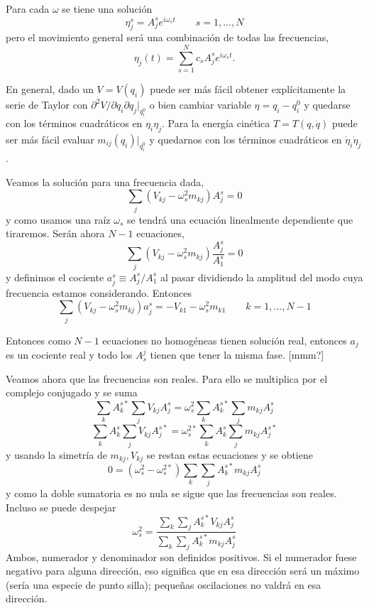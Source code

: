 \documentclass[10pt,oneside]{CBFT_book}
\begin{document}
Para cada $\omega$ se tiene una solución
\[
	\eta_j^s = A_j^s e^{i\omega_s t}	 \qquad s=1,...,N
\]
pero el movimiento general será una combinación de todas las frecuencias,
\[
	\eta_j(t) = \sum_{s=1}^N c_s A_j^s e^{i\omega_s t}.
\]

En general, dado un $V=V(q_i)$ puede ser más fácil obtener explícitamente la serie de Taylor con 
$\partial^2 V/ \partial q_i \partial q_j |_{q_i^0}$ o bien cambiar variable $\eta = q_i - q_i^0$ y quedarse
con los términos cuadráticos en $\eta_i \eta_j$. Para la energía cinética $T=T(q,\dot{q})$ puede ser más
fácil evaluar $m_{ij}(q_i)|_{q_i^0}$ y quedarnos con los términos cuadráticos en $\dot{\eta}_i \dot{\eta}_j$.

Veamos la solución para una frecuencia dada,
\[
	\sum_j ( V_{kj} - \omega_s^2 m_{kj} ) A_j^s = 0
\]
y como usamos una raíz $\omega_s$ se tendrá una ecuación linealmente dependiente que tiraremos. Serán
ahora $N-1$ ecuaciones,
\[
	\sum_j ( V_{kj} - \omega_s^2 m_{kj} ) \frac{A_j^s}{A_1^s} = 0
\]
y definimos el cociente $a_j^s \equiv {A_j^s}/{A_1^s}$ al pasar dividiendo la amplitud del modo cuya frecuencia estamos
considerando. Entonces
\[
	\sum_j ( V_{kj} - \omega_s^2 m_{kj} ) a_j^s = - V_{k1} - \omega_s^2 m_{k1} \qquad k=1,...,N-1
\]

Entonces como $N-1$ ecuaciones no homogéneas tienen solución real, entonces $a_j$ es un cociente real y todo los
$A_s^j$ tienen que tener la misma fase. [mmm?]

Veamos ahora que las frecuencias son reales. Para ello se multiplica por el complejo conjugado y se suma
\[
	\sum_k A_k^{s*} \sum_j V_{kj} A_j^s = \omega_s^2 \sum_k A_k^{s*} \sum_j m_{kj} A_j^s
\]
\[
	\sum_k A_k^{s} \sum_j V_{kj} A_j^{s*} = \omega_s^{2*} \sum_k A_k^{s} \sum_j m_{kj} A_j^{s*}
\]
y usando la simetría de $m_{kj}, V_{kj}$ se restan estas ecuaciones y se obtiene
\[
	0 = ( \omega^2_s - \omega^{2*}_s ) \sum_k \sum_j  A_k^{s*} m_{kj} A_j^{s}
\]
y como la doble sumatoria es no nula se sigue que las frecuencias son reales.
Incluso se puede despejar
\[
	\omega_s^2 = \frac{ \sum_k \sum_j  A_k^{s*} V_{kj} A_j^{s} }{ \sum_k \sum_j  A_k^{s*} m_{kj} A_j^{s} }
\]
Ambos, numerador y denominador son definidos positivos.
Si el numerador fuese negativo para alguna dirección, eso significa que en esa dirección será un máximo (sería una
especie de punto silla); pequeñas oscilaciones no valdrá en esa dirección.
\end{document}

